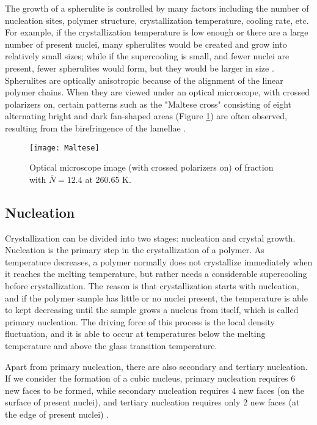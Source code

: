 The growth of a spherulite is controlled by many factors including the number of nucleation sites, polymer structure, crystallization temperature, cooling rate, etc. For example, if the crystallization temperature is low enough or there are a large number of present nuclei, many spherulites would be created and grow into relatively small sizes; while if the supercooling is small, and fewer nuclei are present, fewer spherulites would form, but they would be larger in size \cite{LindaSawyerDavidT.Grubb2008}. Spherulites are optically anisotropic because of the alignment of the linear polymer chains. When they are viewed under an optical microscope, with crossed polarizers on, certain patterns such as the "Maltese cross" consisting of eight alternating bright and dark fan-shaped areas (Figure \ref{fig:Maltese cross}) are often observed, resulting from the birefringence of the lamellae \cite{Bower2002}.

\begin{figure}[H]
\center
\texttt{[image: Maltese]}
\caption{Optical microscope image (with crossed polarizers on) of fraction with $\bar{N} = 12.4$ at 260.65 K.}
\label{fig:Maltese cross}
\end{figure}

\subsection{Nucleation} \label{nucleation}

Crystallization can be divided into two stages: nucleation and crystal growth. Nucleation is the primary step in the crystallization of a polymer. As temperature decreases, a polymer normally does not crystallize immediately when it reaches the melting temperature, but rather needs a considerable supercooling before crystallization. The reason is that crystallization starts with nucleation, and if the polymer sample has little or no nuclei present, the temperature is able to kept decreasing until the sample grows a nucleus from itself, which is called primary nucleation. The driving force of this process is the local density fluctuation, and it is able to occur at temperatures below the melting temperature and above the glass transition temperature.

Apart from primary nucleation, there are also secondary and tertiary nucleation. If we consider the formation of a cubic nucleus, primary nucleation requires 6 new faces to be formed, while secondary nucleation requires 4 new faces (on the surface of present nuclei), and tertiary nucleation requires only 2 new faces (at the edge of present nuclei) \cite{Chai2016}.

